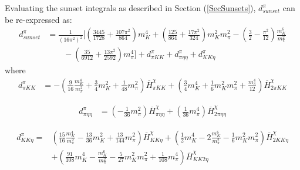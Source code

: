 \documentclass[12pt,a4paper]{article}
\begin{document}
Evaluating the sunset integrals as described in Section (\ref{SecSunsets}), ${d}^{\pi}_{sunset}$ can be re-expressed as:
\begin{align}
	{d}^{\pi}_{sunset} &= \frac{1}{(16 \pi^2)^2} \bigg[ \left(\frac{3445}{1728}+\frac{107 \pi ^2}{864}\right) m_{K}^4+\left(\frac{125}{864}+\frac{17 \pi ^2}{324}\right) m_{K}^2 m_{\pi}^2  - \left(\frac{3}{2}-\frac{\pi ^2}{12}\right) \frac{m_{K}^6}{m_{\pi}^2} \nonumber \\
	& \qquad -\left(\frac{35}{6912}+\frac{13 \pi ^2}{2592}\right) m_{\pi}^4 \bigg] + {d}^{\pi}_{\pi K K} + {d}^{\pi}_{\pi \eta \eta} + {d}^{\pi}_{K K \eta}
\label{dsunsetGMO}
\end{align}
where
\begin{align}
	{d}^{\pi}_{\pi K K} & = - \left(\frac{9}{16} \frac{m_{K}^4}{m_{\pi}^2} + \frac{3}{4} m_{K}^2 + \frac{1}{48} m_{\pi}^2 \right) \overline{H}^{\chi}_{\pi K K} + \left( \frac{3}{4} m_{K}^4 + \frac{1}{6} m_{K}^2 m_{\pi}^2 +\frac{m_{\pi}^4}{12} \right) \overline{H}^{\chi}_{2\pi K K}
\label{dpkk}
\end{align}

\begin{align}
	{d}^{\pi}_{\pi \eta \eta} & = \left( -\frac{1}{36} m_{\pi}^2 \right) \overline{H}^{\chi}_{\pi \eta \eta}+\left( \frac{1}{36} m_{\pi}^4 \right) \overline{H}^{\chi}_{2\pi \eta \eta}
\label{dpee}
\end{align}

\begin{align}
\label{dkkeGMO}
	{d}^{\pi}_{K K \eta} =& \left( \frac{15}{16} \frac{m_{K}^4}{m_{\pi}^2} - \frac{13}{36} m_{K}^2 + \frac{13}{144} m_{\pi}^2 \right) \overline{H}^{\chi}_{K K \eta} + \left( \frac{1}{2} m_{K}^4 - 2 \frac{m_{K}^6}{m_{\pi}^2} - \frac{1}{6} m_{K}^2 m_{\pi}^2 \right) \overline{H}^{\chi}_{2K K \eta} \nonumber \\	
	& + \left( \frac{91}{108} m_{K}^4 - \frac{m_{K}^6}{m_{\pi}^2} - \frac{5}{27} m_{K}^2 m_{\pi}^2 + \frac{1}{108} m_{\pi}^4 \right) \overline{H}^{\chi}_{K K 2\eta}
\end{align}
\end{document}
